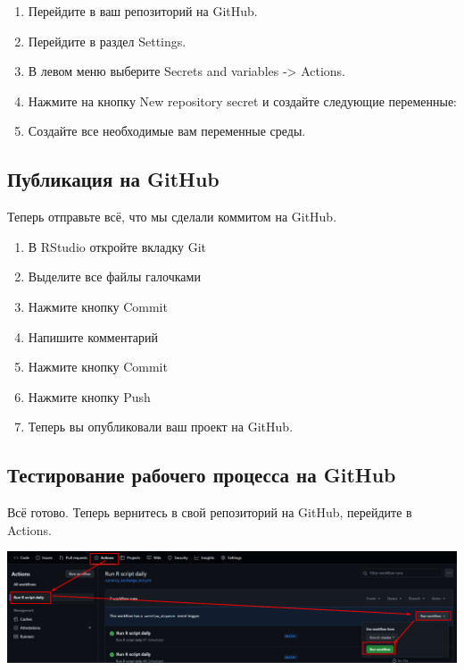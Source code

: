 \documentclass[
]{book}
\providecommand{\tightlist}{%
  \setlength{\itemsep}{0pt}\setlength{\parskip}{0pt}}
\begin{document}
\begin{enumerate}
\def\labelenumi{\arabic{enumi}.}
\tightlist
\item
  Перейдите в ваш репозиторий на GitHub.
\item
  Перейдите в раздел Settings.
\item
  В левом меню выберите Secrets and variables -\textgreater{} Actions.
\item
  Нажмите на кнопку New repository secret и создайте следующие переменные:
\item
  Создайте все необходимые вам переменные среды.
\end{enumerate}

\subsection{Публикация на GitHub}\label{ux43fux443ux431ux43bux438ux43aux430ux446ux438ux44f-ux43dux430-github}

Теперь отправьте всё, что мы сделали коммитом на GitHub.

\begin{enumerate}
\def\labelenumi{\arabic{enumi}.}
\tightlist
\item
  В RStudio откройте вкладку Git
\item
  Выделите все файлы галочками
\item
  Нажмите кнопку Commit
\item
  Напишите комментарий
\item
  Нажмите кнопку Commit
\item
  Нажмите кнопку Push
\item
  Теперь вы опубликовали ваш проект на GitHub.
\end{enumerate}

\subsection{Тестирование рабочего процесса на GitHub}\label{ux442ux435ux441ux442ux438ux440ux43eux432ux430ux43dux438ux435-ux440ux430ux431ux43eux447ux435ux433ux43e-ux43fux440ux43eux446ux435ux441ux441ux430-ux43dux430-github}

Всё готово. Теперь вернитесь в свой репозиторий на GitHub, перейдите в Actions.

\includegraphics{img/1-gh-action-2.webp}
\end{document}

